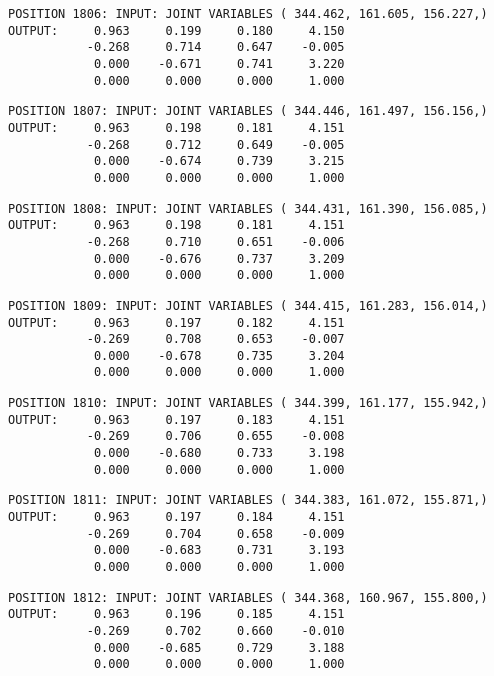 \begin{verbatim}
POSITION 1806: INPUT: JOINT VARIABLES ( 344.462, 161.605, 156.227,)
OUTPUT:     0.963     0.199     0.180     4.150
           -0.268     0.714     0.647    -0.005
            0.000    -0.671     0.741     3.220
            0.000     0.000     0.000     1.000
\end{verbatim} \pagebreak[1]\begin{verbatim}
POSITION 1807: INPUT: JOINT VARIABLES ( 344.446, 161.497, 156.156,)
OUTPUT:     0.963     0.198     0.181     4.151
           -0.268     0.712     0.649    -0.005
            0.000    -0.674     0.739     3.215
            0.000     0.000     0.000     1.000
\end{verbatim} \pagebreak[1]\begin{verbatim}
POSITION 1808: INPUT: JOINT VARIABLES ( 344.431, 161.390, 156.085,)
OUTPUT:     0.963     0.198     0.181     4.151
           -0.268     0.710     0.651    -0.006
            0.000    -0.676     0.737     3.209
            0.000     0.000     0.000     1.000
\end{verbatim} \pagebreak[1]\begin{verbatim}
POSITION 1809: INPUT: JOINT VARIABLES ( 344.415, 161.283, 156.014,)
OUTPUT:     0.963     0.197     0.182     4.151
           -0.269     0.708     0.653    -0.007
            0.000    -0.678     0.735     3.204
            0.000     0.000     0.000     1.000
\end{verbatim} \pagebreak[1]\begin{verbatim}
POSITION 1810: INPUT: JOINT VARIABLES ( 344.399, 161.177, 155.942,)
OUTPUT:     0.963     0.197     0.183     4.151
           -0.269     0.706     0.655    -0.008
            0.000    -0.680     0.733     3.198
            0.000     0.000     0.000     1.000
\end{verbatim} \pagebreak[1]\begin{verbatim}
POSITION 1811: INPUT: JOINT VARIABLES ( 344.383, 161.072, 155.871,)
OUTPUT:     0.963     0.197     0.184     4.151
           -0.269     0.704     0.658    -0.009
            0.000    -0.683     0.731     3.193
            0.000     0.000     0.000     1.000
\end{verbatim} \pagebreak[1]\begin{verbatim}
POSITION 1812: INPUT: JOINT VARIABLES ( 344.368, 160.967, 155.800,)
OUTPUT:     0.963     0.196     0.185     4.151
           -0.269     0.702     0.660    -0.010
            0.000    -0.685     0.729     3.188
            0.000     0.000     0.000     1.000
\end{verbatim} \pagebreak[1]\begin{verbatim}

\end{verbatim}

